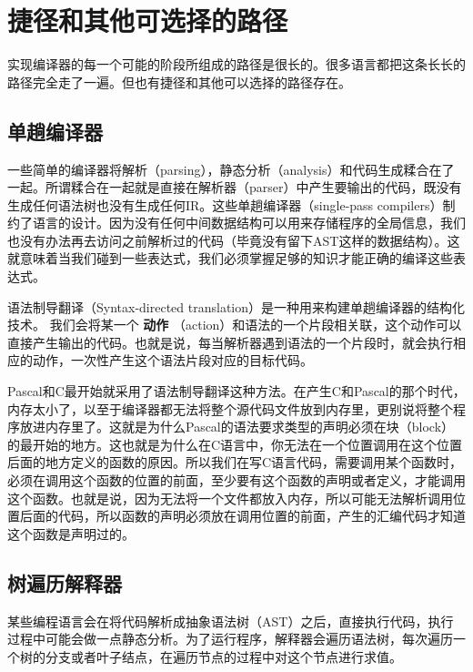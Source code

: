 \documentclass[cn,10pt,math=newtx,citestyle=gb7714-2015,bibstyle=gb7714-2015]{elegantbook}
\begin{document}
\section{捷径和其他可选择的路径}

实现编译器的每一个可能的阶段所组成的路径是很长的。很多语言都把这条长长的路径完全走了一遍。但也有捷径和其他可以选择的路径存在。

\subsection{单趟编译器}

一些简单的编译器将解析（parsing），静态分析（analysis）和代码生成糅合在了一起。所谓糅合在一起就是直接在解析器（parser）中产生要输出的代码，既没有生成任何语法树也没有生成任何IR。这些单趟编译器（single-pass compilers）制约了语言的设计。因为没有任何中间数据结构可以用来存储程序的全局信息，我们也没有办法再去访问之前解析过的代码（毕竟没有留下AST这样的数据结构）。这就意味着当我们碰到一些表达式，我们必须掌握足够的知识才能正确的编译这些表达式。

\begin{tcolorbox}
语法制导翻译（Syntax-directed translation）是一种用来构建单趟编译器的结构化技术。
我们会将某一个 \textbf{动作} （action）和语法的一个片段相关联，这个动作可以直接产生输出的代码。也就是说，每当解析器遇到语法的一个片段时，就会执行相应的动作，一次性产生这个语法片段对应的目标代码。
\end{tcolorbox}

Pascal和C最开始就采用了语法制导翻译这种方法。在产生C和Pascal的那个时代，内存太小了，以至于编译器都无法将整个源代码文件放到内存里，更别说将整个程序放进内存里了。这就是为什么Pascal的语法要求类型的声明必须在块（block）的最开始的地方。这也就是为什么在C语言中，你无法在一个位置调用在这个位置后面的地方定义的函数的原因。所以我们在写C语言代码，需要调用某个函数时，必须在调用这个函数的位置的前面，至少要有这个函数的声明或者定义，才能调用这个函数。也就是说，因为无法将一个文件都放入内存，所以可能无法解析调用位置后面的代码，所以函数的声明必须放在调用位置的前面，产生的汇编代码才知道这个函数是声明过的。

\subsection{树遍历解释器}

某些编程语言会在将代码解析成抽象语法树（AST）之后，直接执行代码，执行过程中可能会做一点静态分析。为了运行程序，解释器会遍历语法树，每次遍历一个树的分支或者叶子结点，在遍历节点的过程中对这个节点进行求值。
\end{document}
